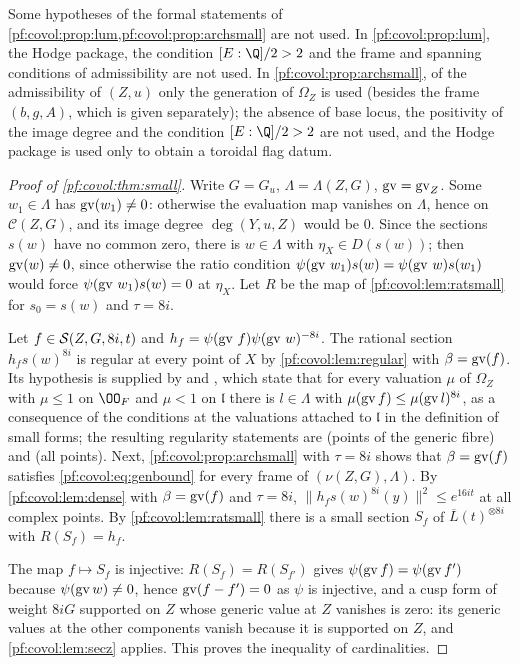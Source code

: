 \begin{remark}\label{pf:covol:rem:archsmall}
Some hypotheses of the formal statements of \cref{pf:covol:prop:lum,pf:covol:prop:archsmall} are not used.
In \cref{pf:covol:prop:lum}, the Hodge package, the condition $[E:\Q]/2>2$ and the frame and spanning
conditions of admissibility are not used. In \cref{pf:covol:prop:archsmall}, of the admissibility of $(Z,u)$
only the generation of $\Omega_Z$ is used (besides the frame $(b,g,A)$, which is given separately); the
absence of base locus, the positivity of the image degree and the condition $[E:\Q]/2>2$ are not used, and
the Hodge package is used only to obtain a toroidal flag datum.
\end{remark}

\begin{proof}[Proof of \cref{pf:covol:thm:small}]
Write $G=G_u$, $\Lambda=\Lambda(Z,G)$, $\operatorname{gv}=\operatorname{gv}_Z$. Some $w_1\in\Lambda$ has
$\operatorname{gv}(w_1)\ne0$: otherwise the evaluation map vanishes on $\Lambda$, hence on $\mathcal C(Z,G)$, and its
image degree $\deg(Y,u,Z)$ would be $0$. Since the sections $s(w)$ have no common zero, there is
$w\in\Lambda$ with $\eta_X\in D(s(w))$; then $\operatorname{gv}(w)\ne0$, since otherwise the ratio condition
$\psi(\operatorname{gv}\,w_1)s(w)=\psi(\operatorname{gv}\,w)s(w_1)$ would force $\psi(\operatorname{gv}\,w_1)s(w)=0$ at $\eta_X$.
Let $R$ be the map of \cref{pf:covol:lem:ratsmall} for $s_0=s(w)$ and $\tau=8i$.

Let $f\in\mathcal{S}(Z,G,8i,t)$ and $h_f=\psi(\operatorname{gv}\,f)\psi(\operatorname{gv}\,w)^{-8i}$. The rational section
$h_fs(w)^{8i}$ is regular at every point of $X$ by \cref{pf:covol:lem:regular} with $\beta=\operatorname{gv}(f)$.
Its hypothesis is supplied by 
and , which state that for every
valuation $\mu$ of $\Omega_Z$ with $\mu\le1$ on $\OO_F$ and $\mu<1$ on $\mathfrak l$ there is $l\in\Lambda$
with $\mu(\operatorname{gv} f)\le\mu(\operatorname{gv} l)^{8i}$, as a consequence of the conditions at the valuations attached
to $\mathfrak l$ in the definition of small forms; the resulting regularity statements are
 (points of the generic fibre) and
 (all points). Next, \cref{pf:covol:prop:archsmall} with $\tau=8i$ shows that $\beta=\operatorname{gv}(f)$ satisfies
\eqref{pf:covol:eq:genbound} for every frame of $(\nu(Z,G),\Lambda)$. By \cref{pf:covol:lem:dense} with
$\beta=\operatorname{gv}(f)$ and $\tau=8i$, $\|h_fs(w)^{8i}(y)\|^2\le e^{16it}$ at all complex points. By
\cref{pf:covol:lem:ratsmall} there is a small section $S_f$ of $\overline L(t)^{\otimes8i}$ with
$R(S_f)=h_f$.

The map $f\mapsto S_f$ is injective: $R(S_f)=R(S_{f'})$ gives $\psi(\operatorname{gv} f)=\psi(\operatorname{gv} f')$ because
$\psi(\operatorname{gv} w)\ne0$, hence $\operatorname{gv}(f-f')=0$ as $\psi$ is injective, and
a cusp form of weight $8iG$ supported on $Z$ whose generic value at $Z$ vanishes is zero: its generic
values at the other components vanish because it is supported on $Z$, and \cref{pf:covol:lem:secz}
applies. This proves the inequality of cardinalities.
\end{proof}

